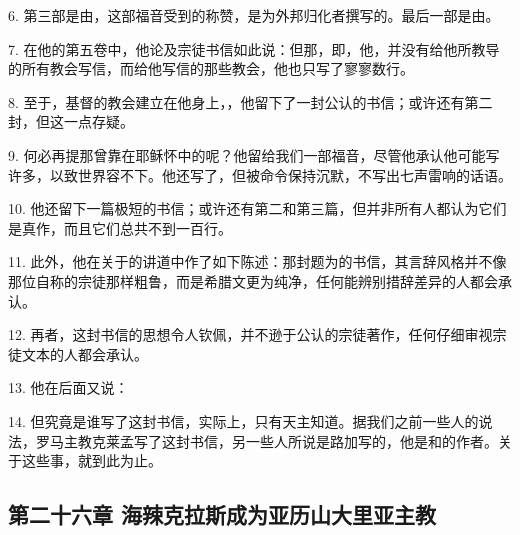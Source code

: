 6. 第三部是由，这部福音受到的称赞，是为外邦归化者撰写的。最后一部是由。\par

7. 在他的第五卷中，他论及宗徒书信如此说：但那，即，他，并没有给他所教导的所有教会写信，而给他写信的那些教会，他也只写了寥寥数行。\par

8. 至于，基督的教会建立在他身上，，他留下了一封公认的书信；或许还有第二封，但这一点存疑。\par

9. 何必再提那曾靠在耶稣怀中的呢？他留给我们一部福音，尽管他承认他可能写许多，以致世界容不下。他还写了，但被命令保持沉默，不写出七声雷响的话语。\par

10. 他还留下一篇极短的书信；或许还有第二和第三篇，但并非所有人都认为它们是真作，而且它们总共不到一百行。\par

11. 此外，他在关于的讲道中作了如下陈述：那封题为的书信，其言辞风格并不像那位自称的宗徒那样粗鲁，而是希腊文更为纯净，任何能辨别措辞差异的人都会承认。\par

12. 再者，这封书信的思想令人钦佩，并不逊于公认的宗徒著作，任何仔细审视宗徒文本的人都会承认。\par

13. 他在后面又说：\par

14. 但究竟是谁写了这封书信，实际上，只有天主知道。据我们之前一些人的说法，罗马主教克莱孟写了这封书信，另一些人所说是路加写的，他是和的作者。关于这些事，就到此为止。\par


\subsection{第二十六章  海辣克拉斯成为亚历山大里亚主教}

